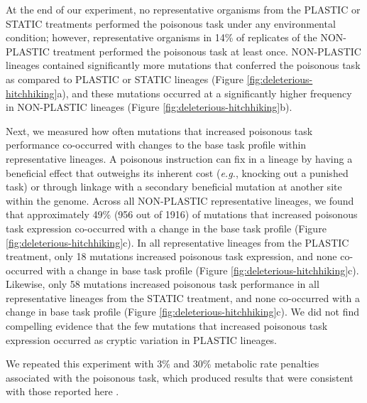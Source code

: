 

At the end of our experiment, no representative organisms from the PLASTIC or STATIC treatments performed the poisonous task under any environmental condition; however, representative organisms in 14\% of replicates of the NON-PLASTIC treatment performed the poisonous task at least once. 
NON-PLASTIC lineages contained significantly more mutations that conferred the poisonous task as compared to PLASTIC or STATIC lineages (Figure \ref{fig:deleterious-hitchhiking}a), and these mutations occurred at a significantly higher frequency in NON-PLASTIC lineages (Figure \ref{fig:deleterious-hitchhiking}b).

Next, we measured how often mutations that increased poisonous task performance co-occurred with changes to the base task profile within representative lineages.
A poisonous instruction can fix in a lineage by having a beneficial effect that outweighs its inherent cost (\textit{e.g.}, knocking out a punished task) or through linkage with a secondary beneficial mutation at another site within the genome.
Across all NON-PLASTIC representative lineages, we found that approximately 49\% (956 out of 1916) of mutations that increased poisonous task expression co-occurred with a change in the base task profile (Figure \ref{fig:deleterious-hitchhiking}c).
In all representative lineages from the PLASTIC treatment, only 18 mutations increased poisonous task expression, and none co-occurred with a change in base task profile (Figure \ref{fig:deleterious-hitchhiking}c).
Likewise, only 58 mutations increased poisonous task performance in all representative lineages from the STATIC treatment, and none co-occurred with a change in base task profile (Figure \ref{fig:deleterious-hitchhiking}c).
We did not find compelling evidence that the few mutations that increased poisonous task expression occurred as cryptic variation in PLASTIC lineages.

We repeated this experiment with 3\% and 30\% metabolic rate penalties associated with the poisonous task, which produced results that were consistent with those reported here \citep{supplemental_material}.